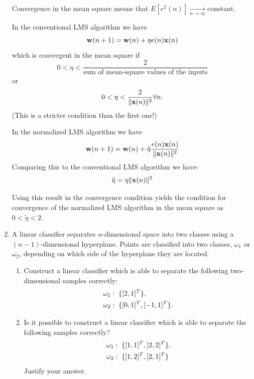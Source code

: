 \documentclass[10pt]{article}
\newcommand{\vw}{{\bf{w}}}
\newcommand{\vx}{{\bf{x}}}
\begin{document}
\begin{enumerate}
Convergence in the mean square means that
$E\left[e^2(n)\right]\xrightarrow[n\rightarrow\infty]{}\mbox{constant}$.

In the conventional LMS algorithm we have
\begin{equation*}
\vw(n+1)=\vw(n)+\eta e(n)\vx(n)
\end{equation*}
which is convergent in the mean
square if 
\begin{equation*}
0<\eta<\frac{2}{\mbox{sum of mean-square values of the
inputs}}\end{equation*}
or 
\begin{equation*}
0<\eta<\frac{2}{\|\vx(n)\|^2} \forall n.
\end{equation*}
 (This is a stricter condition than the first one!)



In the normalized LMS algorithm we have
\begin{equation*}
\vw(n+1)=\vw(n)+\tilde{\eta}\frac{e(n)\vx(n)}{\|\vx(n)\|^2}
\end{equation*}
Comparing this to the conventional LMS algorithm we have:
\begin{equation*}
\tilde{\eta}=\eta\|\vx(n)\|^2
\end{equation*}

Using this result in the convergence condition yields the condition
for convergence of the normalized LMS algorithm in the mean square as
$0<\tilde{\eta}<2$.

\vspace{2mm}


\vspace{12mm}

\item A linear classifier separates $n$-dimensional
space into two classes using a $(n-1)$-dimensional hyperplane. Points
are classified into two classes, $\omega_1$ or $\omega_2$, depending on
which side of the hyperplane they are located.
\begin{enumerate} \item Construct a linear classifier which is able to
separate the following two-dimensional samples correctly:\\
\begin{align}
&\omega_1: \text{\;} \{[2,1]^T\}, \notag \\
&\omega_2: \text{\;} \{[0,1]^T, [-1,1]^T \}. \notag
\end{align}
\item Is it possible to construct a linear classifier which is able to
separate the following samples correctly? \\
\begin{align}
&\omega_1:\text{\;} \{ [1,1]^T, [2,2]^T \}, \notag \\
&\omega_2: \text{\;} \{ [1,2]^T,[2,1]^T \} \notag
\end{align}
Justify your answer.
\end{enumerate}


\end{enumerate}
\end{document}
